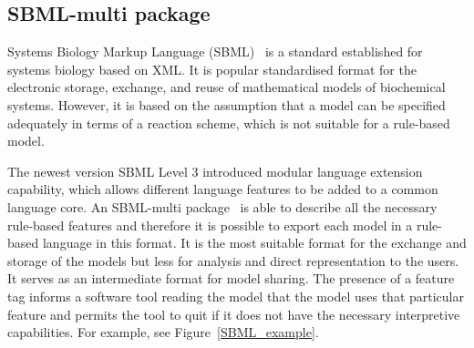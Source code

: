 \documentclass[11pt,a4paper]{report}
\begin{document}
\subsection{SBML-multi package}

Systems Biology Markup Language (SBML)~\cite{hucka2003systems} is a standard established for systems biology based on XML. It is popular standardised format for the electronic storage, exchange, and reuse of mathematical models of biochemical systems. However, it is based on the assumption that a model can be specified adequately in terms of a reaction scheme, which is not suitable for a rule-based model.

The newest version SBML Level 3 introduced modular language extension capability, which allows different language features to be added to a common language core. An SBML-multi package~\cite{SBMLmulti} is able to describe all the necessary rule-based features and therefore it is possible to export each model in a rule-based language in this format. It is the most suitable format for the exchange and storage of the models but less for analysis and direct representation to the users. It serves as an intermediate format for model sharing. The presence of a feature tag informs a software tool reading the model that the model uses that particular feature and permits the tool to quit if it does not have the necessary interpretive capabilities. For example, see Figure~\ref{SBML_example}.
\end{document}
